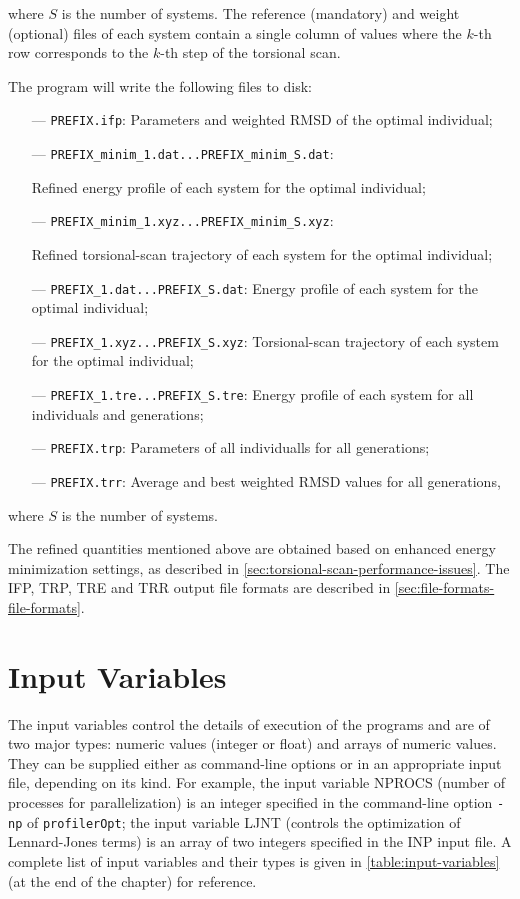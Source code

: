 \documentclass[10pt,a4paper,openany]{memoir}
\numberwithin{equation}{section}
\newcommand{\profileropt}[0]{\texttt{profilerOpt}}
\begin{document}
\noindent where $S$ is the number of systems.
The reference (mandatory) and weight (optional) files of each system contain a single column
of values where the $k$-th row corresponds to the $k$-th step of the
torsional scan.

The program will write the following files to disk:
\begin{itemize}
\item [---]\texttt{PREFIX.ifp}: Parameters and weighted RMSD of the optimal individual;
\item[---] \texttt{PREFIX\_minim\_1.dat...PREFIX\_minim\_S.dat}: \par Refined energy profile of each system for the optimal individual;
\item[---] \texttt{PREFIX\_minim\_1.xyz...PREFIX\_minim\_S.xyz}: \par Refined torsional-scan trajectory of each system for the optimal individual;
\item[---] \texttt{PREFIX\_1.dat...PREFIX\_S.dat}: Energy profile of each system for the optimal individual;
\item[---] \texttt{PREFIX\_1.xyz...PREFIX\_S.xyz}: Torsional-scan trajectory of each system for the optimal individual;
\item [---]\texttt{PREFIX\_1.tre...PREFIX\_S.tre}: Energy profile of each system for all individuals and generations;
\item [---]\texttt{PREFIX.trp}: Parameters of all individualls for all generations;
\item [---]\texttt{PREFIX.trr}: Average and best weighted RMSD values for all generations,
\end{itemize}
where $S$ is the number of systems.

The refined quantities mentioned above are obtained based on enhanced
energy minimization settings, as described in \autoref{sec:torsional-scan-performance-issues}.
The IFP, TRP, TRE and TRR output file formats are described in
\autoref{sec:file-formats-file-formats}.


\section{Input Variables}
\label{sec:file-formats-input-variables}

The input variables control the details of execution of the programs
and are of two major types: numeric values (integer or float) and
arrays of numeric values. They can be supplied either as command-line
options or in an appropriate input file, depending on its kind.  For
example, the input variable NPROCS (number of processes for
parallelization) is an integer specified in the command-line option
\texttt{-np} of \profileropt{}; the input variable LJNT (controls the
optimization of Lennard-Jones terms) is an array of two integers
specified in the INP input file. A complete list of input variables
and their types is given in \autoref{table:input-variables} (at the
end of the chapter) for reference.
\end{document}
